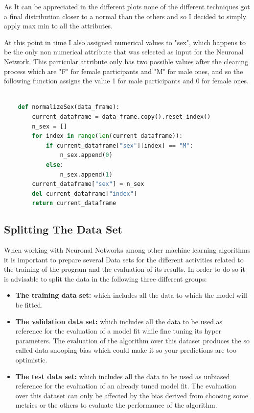 \documentclass[12pt, a4paper]{article}
\begin{document}
	As It can be appreciated in the different plots none of the different techniques got a final distribution closer to a normal than the others and so I decided to simply apply max min to all the attributes.
	
	At this point in time I also assigned numerical values to "sex", which happens to be the only non numerical attribute  that was selected as input for the Neuronal Network. This particular attribute only has two possible values after the cleaning process which are "F" for female participants and "M" for male ones, and so the following function assigns the value 1 for male participants and 0 for female ones.
	
	\vspace{5mm}
	
	\begin{lstlisting}[language=Python]
		
	def normalizeSex(data_frame):
		current_dataframe = data_frame.copy().reset_index()
		n_sex = []
		for index in range(len(current_dataframe)):
			if current_dataframe["sex"][index] == "M":
				n_sex.append(0)
			else:
				n_sex.append(1)
		current_dataframe["sex"] = n_sex
		del current_dataframe["index"]
		return current_dataframe
	\end{lstlisting}
	
	\clearpage
	
	\subsection{Splitting The Data Set}
	
	When working with Neuronal Notworks among other machine learning algorithms it is important to prepare several Data sets for the different activities related to the training of the program and the evaluation of its results. In order to do so it is advisable to split the data in the following three different groups:\cite{dateTestsDefs}
	
	\begin{itemize}
		
		\item \textbf{The training data set:} which includes all the data to which the model will be fitted.
		
		\item \textbf{The validation data set:} which includes all the data to be used as reference for the evaluation of a model fit while fine tuning its hyper parameters. The evaluation of the algorithm over this dataset produces the so called data snooping bias which could make it so your predictions are too optimistic.
		
		\item \textbf{The test data set:} which includes all the data to be used as unbiased reference for the evaluation of an already tuned model fit. The evaluation over this dataset can only be affected by the bias derived from choosing some metrics or the others to evaluate the performance of the algorithm.
		
	\end{itemize}
\end{document}
